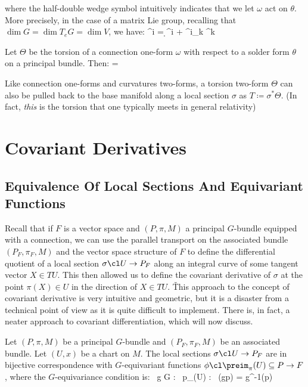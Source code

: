 where the half-double wedge symbol intuitively indicates that we let $\omega$ act on $\theta$. More precisely, in the
case of a matrix Lie group, recalling that $\dim G = \dim T_e G = \dim V$, we have:
\bse
\Theta^i = \d \theta^i + \omega^i_{\phantom{i}k} \halfWedge \theta^k
\ese

Let $\Theta$ be the torsion of a connection one-form $\omega$ with respect to a solder form $\theta$ on a principal
bundle. Then:
\bse
\D \Theta = \Omega \halfWedge \theta
\ese
\et

Like connection one-forms and curvatures two-forms, a torsion two-form $\Theta$ can also be pulled back to the base
manifold along a local section $\sigma$ as $T \coloneqq \sigma^*\Theta$. (In fact, \emph{this} is the torsion that
one typically meets in general relativity)

\section{Covariant Derivatives}

\subsection{Equivalence Of Local Sections And Equivariant Functions}

Recall that if $F$ is a vector space and $(P,\pi,M)$ a principal $G$-bundle equipped with a connection, we can use
the parallel transport on the associated bundle $(P_F,\pi_F,M)$ and the vector space structure of $F$ to define the
differential quotient of a local section $\sigma \cl U\to P_F$ along an integral curve of some tangent vector $X\in
TU$. This then allowed us to define the covariant derivative of $\sigma$ at the point $\pi(X)\in U$ in the direction
of $X\in TU$. \v

This approach to the concept of covariant derivative is very intuitive and geometric, but it is a disaster from a
technical point of view as it is quite difficult to implement. There is, in fact, a neater approach to covariant
differentiation, which will now discuss.

\bt[]
Let $(P,\pi,M)$ be a principal $G$-bundle and $(P_F,\pi_F,M)$ be an associated bundle. Let $(U,x)$ be a chart on $M$.
The local sections $\sigma\cl U \to P_F$ are in bijective correspondence with $G$-equivariant functions
$\phi\cl\preim_{\pi}(U)\subseteq P \to F$, where the $G$-equivariance condition is:
\bse
\forall \, g \in G : \forall \, p\in \preim_{\pi}(U) : \ \phi(g\racts p) = g^{-1}\lacts \phi(p)
\ese
\et

